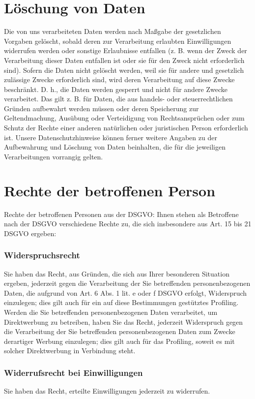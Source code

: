 \documentclass[12pt]{article}
\begin{document}
\part{Löschung von Daten}
Die von uns verarbeiteten Daten werden nach Maßgabe der gesetzlichen Vorgaben gelöscht, sobald deren zur Verarbeitung erlaubten Einwilligungen widerrufen werden oder sonstige Erlaubnisse entfallen (z. B. wenn der Zweck der Verarbeitung dieser Daten entfallen ist oder sie für den Zweck nicht erforderlich sind). Sofern die Daten nicht gelöscht werden, weil sie für andere und gesetzlich zulässige Zwecke erforderlich sind, wird deren Verarbeitung auf diese Zwecke beschränkt. D. h., die Daten werden gesperrt und nicht für andere Zwecke verarbeitet. Das gilt z. B. für Daten, die aus handels- oder steuerrechtlichen Gründen aufbewahrt werden müssen oder deren Speicherung zur Geltendmachung, Ausübung oder Verteidigung von Rechtsansprüchen oder zum Schutz der Rechte einer anderen natürlichen oder juristischen Person erforderlich ist. Unsere Datenschutzhinweise können ferner weitere Angaben zu der Aufbewahrung und Löschung von Daten beinhalten, die für die jeweiligen Verarbeitungen vorrangig gelten.

\part{Rechte der betroffenen Person}
Rechte der betroffenen Personen aus der DSGVO: Ihnen stehen als Betroffene nach der DSGVO verschiedene Rechte zu, die sich insbesondere aus Art. 15 bis 21 DSGVO ergeben:

\section{Widerspruchsrecht}
Sie haben das Recht, aus Gründen, die sich aus Ihrer besonderen Situation ergeben, jederzeit gegen die Verarbeitung der Sie betreffenden personenbezogenen Daten, die aufgrund von Art. 6 Abs. 1 lit. e oder f DSGVO erfolgt, Widerspruch einzulegen; dies gilt auch für ein auf diese Bestimmungen gestütztes Profiling. Werden die Sie betreffenden personenbezogenen Daten verarbeitet, um Direktwerbung zu betreiben, haben Sie das Recht, jederzeit Widerspruch gegen die Verarbeitung der Sie betreffenden personenbezogenen Daten zum Zwecke derartiger Werbung einzulegen; dies gilt auch für das Profiling, soweit es mit solcher Direktwerbung in Verbindung steht.

\section{Widerrufsrecht bei Einwilligungen}
Sie haben das Recht, erteilte Einwilligungen jederzeit zu widerrufen.
\end{document}
